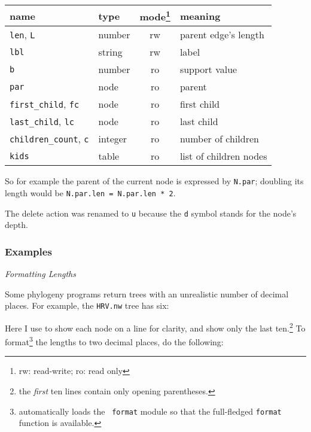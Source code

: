 \begin{center}
	\begin{minipage}{0.8\textwidth}
		\begin{tabular}{llcl}
			name & type & mode\footnote{rw: read-write; ro: read only} & meaning \\
			\hline
			\texttt{len}, \texttt{L} 	& number 	& rw & parent edge's length \\
			\texttt{lbl}							& string 	& rw & label \\
			\texttt{b}								& number	& ro & support value \\
			\texttt{par}							& node		& ro & parent \\
			\texttt{first\_child}, \texttt{fc}  & node & ro & first child \\
			\texttt{last\_child}, \texttt{lc} 	& node & ro & last child \\
			\texttt{children\_count}, \texttt{c} 	& integer & ro & number of children \\
			\texttt{kids}							& table		& ro & list of children nodes
		\end{tabular}
	\end{minipage}
\end{center}

So for example the parent of the current node is expressed by \texttt{N.par};
doubling its length would be \texttt{N.par.len = N.par.len * 2}. 

The delete action was renamed to \texttt{u} because the \texttt{d} symbol stands
for the node's depth.

\subsubsection{Examples}

{\it Formatting Lengths} 

\noindent{}Some phylogeny programs return \nw{} trees with an unrealistic number
of decimal places. For example, the \texttt{HRV.nw} tree has six:


\begin{samepage}

\end{samepage}

\noindent{}Here I use \nwindent{} to show each node on a line for clarity, and
show only the last ten.\footnote{the \emph{first} ten lines contain only
opening parentheses.} To format\footnote{\sched{} automatically loads the {\tt
format} module so that the full-fledged {\tt format} function is available.}
the lengths to two decimal places, do the following:

